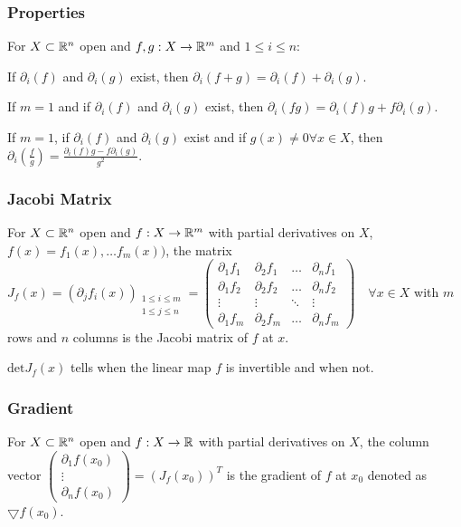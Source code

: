 \subsubsection{Properties}
For $X \subset \mathbb{R}^n$ open and $f, g: X \to \mathbb{R}^m$ and $1 \le i \le n$:
\begin{compactitem}
    \item If $\partial_i (f)$ and $\partial_i (g)$ exist, then $\partial_i (f + g) = \partial_i (f) + \partial_i (g)$.
    \item If $m = 1$ and if $\partial_i (f)$ and $\partial_i (g)$ exist, then $\partial_i (fg) = \partial_i (f)g + f \partial_i (g)$.
    \item If $m = 1$, if $\partial_i (f)$ and $\partial_i (g)$ exist and if $g(x) \neq 0 \forall x \in X$, then $\partial_i (\frac{f}{g}) = \frac{\partial_i (f)g - f \partial_i (g)}{g^2}$.
\end{compactitem}

\subsubsection{Jacobi Matrix}
For $X \subset \mathbb{R}^n$ open and $f: X \to \mathbb{R}^m$ with partial derivatives on $X$, $f(x) = f_1(x), \dots f_m(x))$, the matrix $J_f(x) = (\partial_j f_i(x))_{\substack{1 \le i \le m\\1 \le j \le n}} =
    \begin{pmatrix}
        \partial_1 f_1 & \partial_2 f_1 & \dots & \partial_n f_1\\
        \partial_1 f_2 & \partial_2 f_2 & \dots & \partial_n f_2\\
        \vdots & \vdots & \ddots & \vdots \\
        \partial_1 f_m & \partial_2 f_m & \dots & \partial_n f_m
    \end{pmatrix}
\quad \forall x \in X$ with $m$ rows and $n$ columns is the Jacobi matrix of $f$ at $x$.

\begin{compactitem}
    \item $\text{det} J_f(x)$ tells when the linear map $f$ is invertible and when not.
\end{compactitem}

\subsubsection{Gradient}
For $X \subset \mathbb{R}^n$ open and $f: X \to \mathbb{R}$ with partial derivatives on $X$, the column vector $
\begin{pmatrix}
    \partial_1 f(x_0)\\
    \vdots\\
    \partial_n f(x_0)
\end{pmatrix}
= (J_f(x_0))^T$ is the gradient of $f$ at $x_0$ denoted as $\bigtriangledown f(x_0)$.

